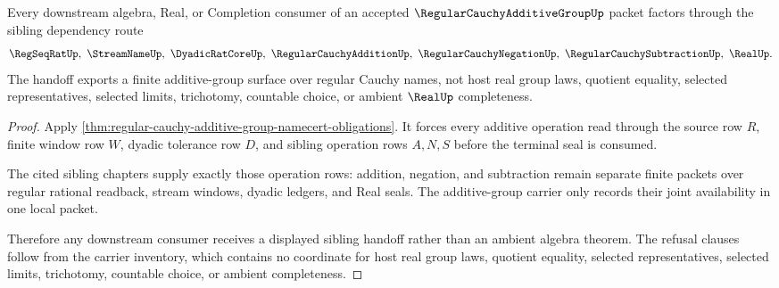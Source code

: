 \begin{theorem}
\label{thm:regular-cauchy-additive-group-sibling-handoff}
Every downstream algebra, Real, or Completion consumer of an accepted $\RegularCauchyAdditiveGroupUp$ packet factors through the sibling dependency route
$$
\RegSeqRatUp,\ \StreamNameUp,\ \DyadicRatCoreUp,\ \RegularCauchyAdditionUp,\ \RegularCauchyNegationUp,\ \RegularCauchySubtractionUp,\ \RealUp .
$$
The handoff exports a finite additive-group surface over regular Cauchy names, not host real group laws, quotient equality, selected representatives, selected limits, trichotomy, countable choice, or ambient $\RealUp$ completeness.
\end{theorem}
\begin{proof}
Apply \autoref{thm:regular-cauchy-additive-group-namecert-obligations}. It forces every additive operation read through the source row $R$, finite window row $W$, dyadic tolerance row $D$, and sibling operation rows $A,N,S$ before the terminal seal is consumed.

The cited sibling chapters supply exactly those operation rows: addition, negation, and subtraction remain separate finite packets over regular rational readback, stream windows, dyadic ledgers, and Real seals. The additive-group carrier only records their joint availability in one local packet.

Therefore any downstream consumer receives a displayed sibling handoff rather than an ambient algebra theorem. The refusal clauses follow from the carrier inventory, which contains no coordinate for host real group laws, quotient equality, selected representatives, selected limits, trichotomy, countable choice, or ambient completeness.
\end{proof}


